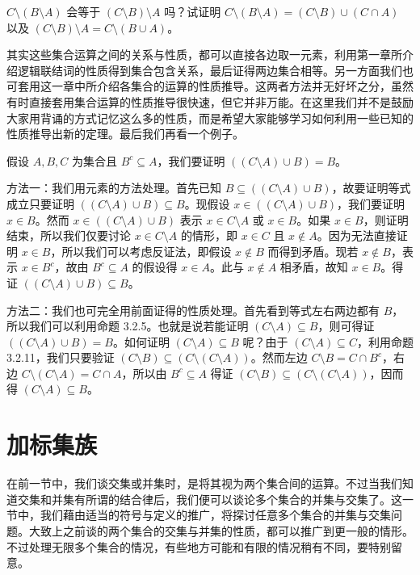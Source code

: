 \begin{question}
$C \setminus (B \setminus A)$ 会等于 $(C \setminus B) \setminus A$ 吗？试证明 $C \setminus (B \setminus A) = (C \setminus B) \cup (C \cap A)$ 以及 $(C \setminus B) \setminus A = C \setminus (B \cup A)$。
\end{question}

其实这些集合运算之间的关系与性质，都可以直接各边取一元素，利用第一章所介绍逻辑联结词的性质得到集合包含关系，最后证得两边集合相等。另一方面我们也可套用这一章中所介绍各集合的运算的性质推导。这两者方法并无好坏之分，虽然有时直接套用集合运算的性质推导很快速，但它并非万能。在这里我们并不是鼓励大家用背诵的方式记忆这么多的性质，而是希望大家能够学习如何利用一些已知的性质推导出新的定理。最后我们再看一个例子。

\begin{example}
假设 $A, B, C$ 为集合且 $B^c \subseteq A$，我们要证明 $((C \setminus A) \cup B) = B$。
\end{example}

方法一：我们用元素的方法处理。首先已知 $B \subseteq ((C \setminus A) \cup B)$，故要证明等式成立只要证明 $((C \setminus A) \cup B) \subseteq B$。现假设 $x \in ((C \setminus A) \cup B)$，我们要证明 $x \in B$。然而 $x \in ((C \setminus A) \cup B)$ 表示 $x \in C \setminus A$ 或 $x \in B$。如果 $x \in B$，则证明结束，所以我们仅要讨论 $x \in C \setminus A$ 的情形，即 $x \in C$ 且 $x \notin A$。因为无法直接证明 $x \in B$，所以我们可以考虑反证法，即假设 $x \notin B$ 而得到矛盾。现若 $x \notin B$，表示 $x \in B^c$，故由 $B^c \subseteq A$ 的假设得 $x \in A$。此与 $x \notin A$ 相矛盾，故知 $x \in B$。得证 $((C \setminus A) \cup B) \subseteq B$。

方法二：我们也可完全用前面证得的性质处理。首先看到等式左右两边都有 $B$，所以我们可以利用命题 3.2.5。也就是说若能证明 $(C \setminus A) \subseteq B$，则可得证 $((C \setminus A) \cup B) = B$。如何证明 $(C \setminus A) \subseteq B$ 呢？由于 $(C \setminus A) \subseteq C$，利用命题 3.2.11，我们只要验证 $(C \setminus B) \subseteq (C \setminus (C \setminus A))$。然而左边 $C \setminus B = C \cap B^c$，右边 $C \setminus (C \setminus A) = C \cap A$，所以由 $B^c \subseteq A$ 得证 $(C \setminus B) \subseteq (C \setminus (C \setminus A))$，因而得 $(C \setminus A) \subseteq B$。

\section{加标集族}

在前一节中，我们谈交集或并集时，是将其视为两个集合间的运算。不过当我们知道交集和并集有所谓的结合律后，我们便可以谈论多个集合的并集与交集了。这一节中，我们藉由适当的符号与定义的推广，将探讨任意多个集合的并集与交集问题。大致上之前谈的两个集合的交集与并集的性质，都可以推广到更一般的情形。不过处理无限多个集合的情况，有些地方可能和有限的情况稍有不同，要特别留意。


